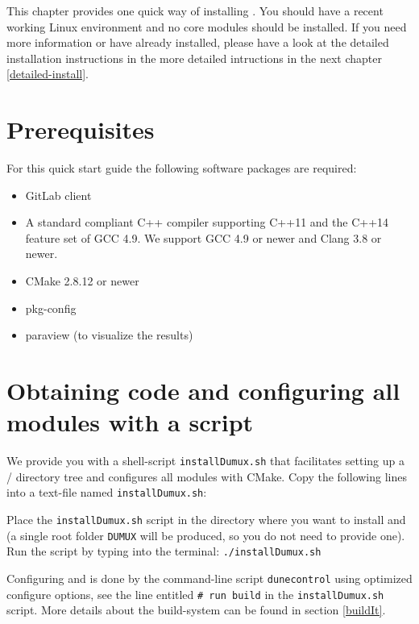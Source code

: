 This chapter provides one quick way of installing \Dumux.
You should have a recent working Linux environment and no \Dune core modules should be installed.
If you need more information or
have \Dune already installed, please have a look at the detailed installation
instructions in the more detailed intructions in the next chapter \ref{detailed-install}.

\section{Prerequisites} \label{sec:prerequisites}
For this quick start guide the following software packages are required:
\begin{itemize}
\item GitLab client
\item A standard compliant C++ compiler supporting C++11 and the C++14 feature set of GCC 4.9. We support GCC 4.9 or newer and Clang 3.8 or newer.
\item CMake 2.8.12 or newer
\item pkg-config
\item paraview (to visualize the results)
\end{itemize}

\section{Obtaining code and configuring all modules with a script}
We provide you with a shell-script \texttt{installDumux.sh} that facilitates setting up a {\Dune}/{\Dumux} directory tree
and configures all modules with CMake.
Copy the following lines into a text-file named \texttt{installDumux.sh}:


Place the \texttt{installDumux.sh} script in the directory where you want to install \Dumux and \Dune (a single
root folder \texttt{DUMUX} will be produced, so you do not need to provide one).
Run the script by typing into the terminal: \texttt{./installDumux.sh}

Configuring \Dune and \Dumux is done by the command-line script \texttt{dunecontrol}
using optimized configure options, see the line entitled \texttt{\# run build} in the \texttt{installDumux.sh} script.
More details about the build-system can be found in section \ref{buildIt}.

